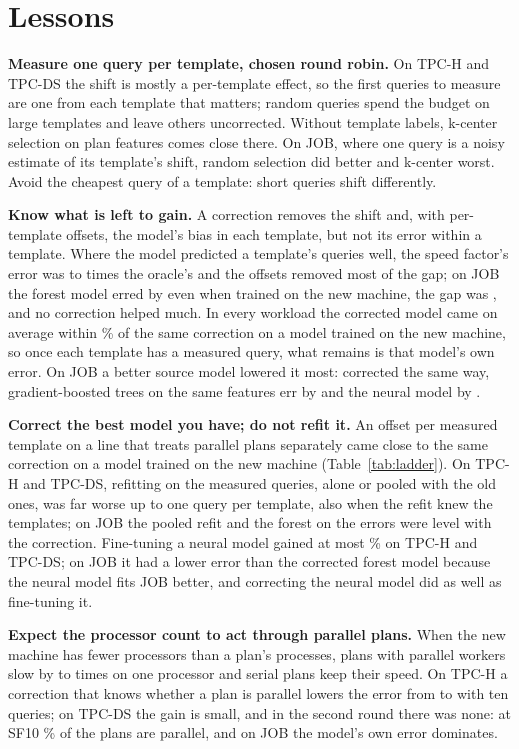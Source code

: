 \documentclass[conference]{IEEEtran}
\begin{document}
\section{Lessons}
\label{sec:lessons}

\textbf{Measure one query per template, chosen round robin.} On TPC-H and
TPC-DS the shift is mostly a per-template effect, so the first queries to
measure are one from each template that matters; random queries spend the
budget on large templates and leave others uncorrected. Without template
labels, k-center selection on plan features comes close there. On JOB,
where one query is a noisy estimate of its template's shift, random
selection did better and k-center worst. Avoid the cheapest query of a
template: short queries shift differently.

\textbf{Know what is left to gain.} A correction removes the shift and,
with per-template offsets, the model's bias in each template, but not its
error within a template. Where the model predicted a template's queries
well, the speed factor's error was \XeRoomTpcds{} to \XeRoomTpch{} times
the oracle's and the offsets removed most of the gap; on JOB the forest
model erred by \XJobKHOracle{} even when trained on the new machine, the
gap was \XeRoomJob, and no correction helped much. In every workload the
corrected model came on average within \XeMoveMaxPct\% of the same
correction on a model trained on the new machine, so once each template
has a measured query, what remains is that model's own error. On JOB a
better source model lowered it most: corrected the same way,
gradient-boosted trees on the same features err by
\XeSrcJobBoostingPrimary{} and the neural model by
\NNExtJobRrNnTplKThreeThree.

\textbf{Correct the best model you have; do not refit it.} An offset per
measured template on a line that treats parallel plans separately came
close to the same correction on a model trained on the new machine
(Table~\ref{tab:ladder}). On TPC-H and TPC-DS, refitting on the measured
queries, alone or pooled with the old ones, was far worse up to one query
per template, also when the refit knew the templates; on JOB the pooled
refit and the forest on the errors were level with the correction.
Fine-tuning a neural model gained at most \XtraNnGainPct\% on TPC-H and
TPC-DS; on JOB it had a lower error than the corrected forest model because
the neural model fits JOB better, and correcting the neural model did as
well as fine-tuning it.

\textbf{Expect the processor count to act through parallel plans.} When the
new machine has fewer processors than a plan's processes, plans with
parallel workers slow by \PSTpcdsMThreetoMFourParallelX{} to
\PSTpchMOnetoMTwoParallelX{} times on one processor and serial plans keep
their speed. On TPC-H a correction that knows whether a plan is parallel
lowers the error from \PATpchProcessorsRandomSpeedOneZero{} to
\PATpchProcessorsRandomAffineParallelOneZero{} with ten queries; on TPC-DS
the gain is small, and in the second round there was none: at SF10
\XeParallelTpchTen\% of the plans are parallel, and on JOB the model's own
error dominates.
\end{document}
